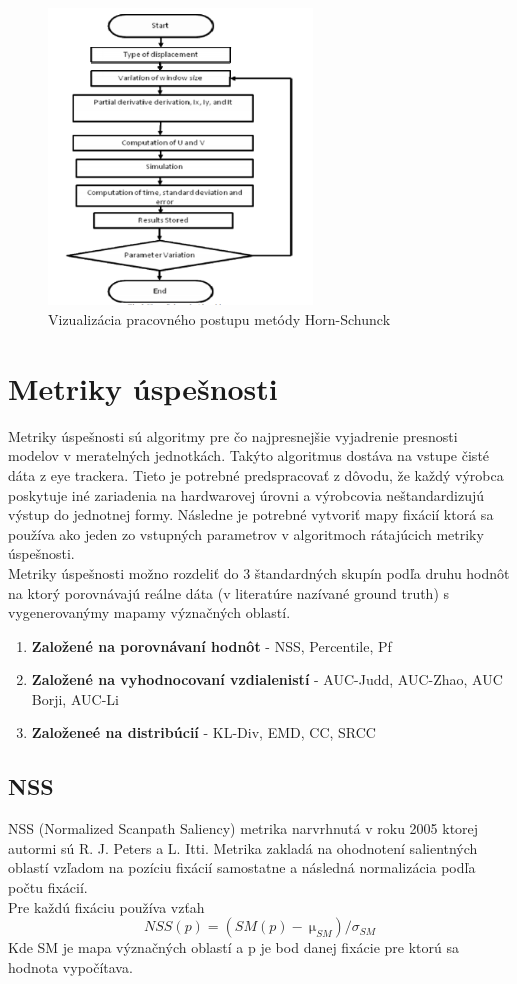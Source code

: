\begin{figure}[H]
  \centering
  \includegraphics[width=7cm]{pics/horn-schunck.png}
  \caption{Vizualizácia pracovného postupu metódy Horn-Schunck}
\end{figure}
\vspace{10mm}

\section{Metriky úspešnosti}
Metriky úspešnosti sú algoritmy pre čo najpresnejšie vyjadrenie presnosti modelov v meratelných jednotkách.
Takýto algoritmus dostáva na vstupe čisté dáta z eye trackera.
Tieto je potrebné predspracovať z dôvodu, že každý výrobca poskytuje iné zariadenia na hardwarovej úrovni a výrobcovia neštandardizujú výstup do jednotnej formy.
Následne je potrebné vytvoriť mapy fixácií ktorá sa používa ako jeden zo vstupných parametrov v algoritmoch rátajúcich metriky úspešnosti.
\\
Metriky úspešnosti možno rozdeliť do 3 štandardných skupín podľa druhu hodnôt na ktorý porovnávajú reálne dáta (v literatúre nazívané ground truth) s vygenerovanýmy mapamy význačných oblastí\cite{metrics-1}.
\begin{enumerate}
  \item\textbf{Založené na porovnávaní hodnôt} - NSS, Percentile, Pf
  \item\textbf{Založené na vyhodnocovaní vzdialenistí} - AUC-Judd, AUC-Zhao, AUC Borji, AUC-Li
  \item\textbf{Založeneé na distribúcií} - KL-Div, EMD, CC, SRCC
\end{enumerate}

\subsection{NSS}
NSS (Normalized Scanpath Saliency) metrika narvrhnutá v roku 2005 ktorej autormi sú R.
J.
Peters a L.
Itti.
Metrika zakladá na ohodnotení salientných oblastí vzľadom na pozíciu fixácií samostatne a následná normalizácia podľa počtu fixácií.
\\
Pre každú fixáciu používa vzťah
  \begin{equation}
    NSS(p) =  (SM(p)-\SI{}{\micro}_{SM}) / 	\sigma_{SM}
  \end{equation}
Kde SM je mapa význačných oblastí a p je bod danej fixácie pre ktorú sa hodnota vypočítava.

